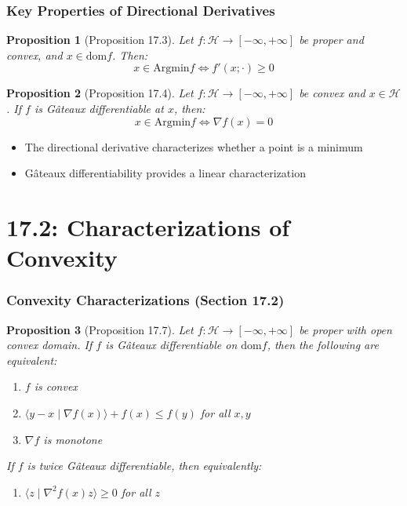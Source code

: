 \documentclass[aspectratio=169,10pt]{beamer}
\newtheorem{prop}{Proposition}
\begin{document}
\begin{frame}
  \frametitle{Key Properties of Directional Derivatives}

  \begin{prop}[Proposition 17.3]
    Let $f: \mathcal{H} \to [-\infty, +\infty]$ be proper and convex, and $x \in \text{dom} f$. Then:
    \[
    x \in \text{Argmin} f \iff f'(x; \cdot) \geq 0
    \]
  \end{prop}

  \begin{prop}[Proposition 17.4]
    Let $f: \mathcal{H} \to [-\infty, +\infty]$ be convex and $x \in \mathcal{H}$. If $f$ is Gâteaux differentiable at $x$, then:
    \[
    x \in \text{Argmin} f \iff \nabla f(x) = 0
    \]
  \end{prop}

  \begin{itemize}
    \item The directional derivative characterizes whether a point is a minimum
    \item Gâteaux differentiability provides a linear characterization
  \end{itemize}
\end{frame}

\section{17.2: Characterizations of Convexity}
\begin{frame}
  \frametitle{Convexity Characterizations (Section 17.2)}

  \begin{prop}[Proposition 17.7]
    Let $f: \mathcal{H} \to [-\infty, +\infty]$ be proper with open convex domain. If $f$ is Gâteaux differentiable on $\text{dom} f$, then the following are equivalent:
    \begin{enumerate}
      \item[(i)] $f$ is convex
      \item[(ii)] $\langle y - x \mid \nabla f(x) \rangle + f(x) \leq f(y)$ for all $x, y$
      \item[(iii)] $\nabla f$ is monotone
    \end{enumerate}

    \vspace{0.5cm}
    If $f$ is twice Gâteaux differentiable, then equivalently:
    \begin{enumerate}
      \item[(iv)] $\langle z \mid \nabla^2 f(x) z \rangle \geq 0$ for all $z$
    \end{enumerate}
  \end{prop}
\end{frame}
\end{document}
